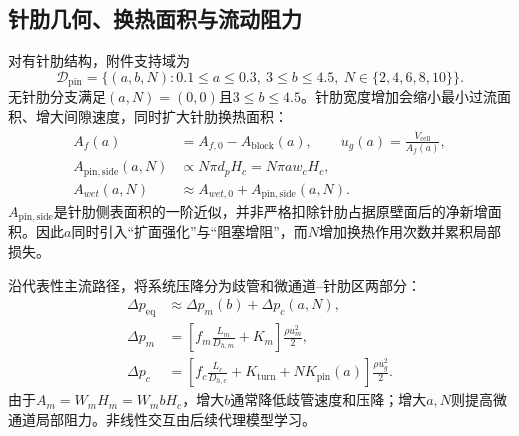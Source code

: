 \documentclass[UTF8,12pt,a4paper]{ctexart}
\newcommand{\Vdot}{\dot V}
\begin{document}
\subsection{针肋几何、换热面积与流动阻力}
对有针肋结构，附件支持域为
\begin{equation}
\mathcal D_{\mathrm{pin}}=\{(a,b,N):0.1\le a\le0.3,\ 3\le b\le4.5,
\ N\in\{2,4,6,8,10\}\}.
\end{equation}
无针肋分支满足$(a,N)=(0,0)$且$3\le b\le4.5$。针肋宽度增加会缩小最小过流面积、增大间隙速度，同时扩大针肋换热面积：
\begin{align}
A_f(a)&=A_{f,0}-A_{\mathrm{block}}(a),\qquad
u_g(a)=\frac{\Vdot_{\mathrm{cell}}}{A_f(a)},\\
A_{\mathrm{pin,side}}(a,N)&\propto N\pi d_pH_c=N\pi aw_cH_c,\\
A_{wet}(a,N)&\approx A_{wet,0}+A_{\mathrm{pin,side}}(a,N).
\end{align}
$A_{\mathrm{pin,side}}$是针肋侧表面积的一阶近似，并非严格扣除针肋占据原壁面后的净新增面积。因此$a$同时引入“扩面强化”与“阻塞增阻”，而$N$增加换热作用次数并累积局部损失。

沿代表性主流路径，将系统压降分为歧管和微通道--针肋区两部分：
\begin{align}
\Delta p_{\mathrm{eq}}&\approx\Delta p_m(b)+\Delta p_c(a,N),\\
\Delta p_m&=\left[f_m\frac{L_m}{D_{h,m}}+K_m\right]\frac{\rho u_m^2}{2},\\
\Delta p_c&=\left[f_c\frac{L_c}{D_{h,c}}+K_{\mathrm{turn}}+N K_{\mathrm{pin}}(a)\right]
\frac{\rho u_g^2}{2}.
\end{align}
由于$A_m=W_mH_m=W_mbH_c$，增大$b$通常降低歧管速度和压降；增大$a,N$则提高微通道局部阻力。非线性交互由后续代理模型学习。
\end{document}
